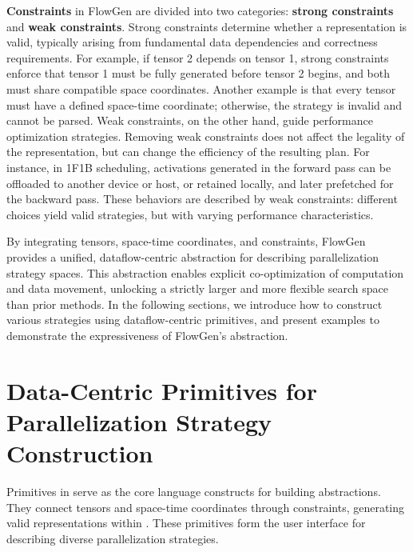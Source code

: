 \textbf{Constraints} in FlowGen are divided into two categories: \textbf{strong constraints} and \textbf{weak constraints}. Strong constraints determine whether a representation is valid, typically arising from fundamental data dependencies and correctness requirements. For example, if tensor 2 depends on tensor 1, strong constraints enforce that tensor 1 must be fully generated before tensor 2 begins, and both must share compatible space coordinates. Another example is that every tensor must have a defined space-time coordinate; otherwise, the strategy is invalid and cannot be parsed. Weak constraints, on the other hand, guide performance optimization strategies. Removing weak constraints does not affect the legality of the representation, but can change the efficiency of the resulting plan. For instance, in 1F1B scheduling, activations generated in the forward pass can be offloaded to another device or host, or retained locally, and later prefetched for the backward pass. These behaviors are described by weak constraints: different choices yield valid strategies, but with varying performance characteristics.

By integrating tensors, space-time coordinates, and constraints, FlowGen provides a unified, dataflow-centric abstraction for describing parallelization strategy spaces. This abstraction enables explicit co-optimization of computation and data movement, unlocking a strictly larger and more flexible search space than prior methods. In the following sections, we introduce how to construct various strategies using dataflow-centric primitives, and present examples to demonstrate the expressiveness of FlowGen's abstraction.


\section{Data-Centric Primitives for Parallelization Strategy Construction}



Primitives in \name{} serve as the core language constructs for building abstractions. They connect tensors and space-time coordinates through constraints, generating valid representations within \name{}. These primitives form the user interface for describing diverse parallelization strategies.

